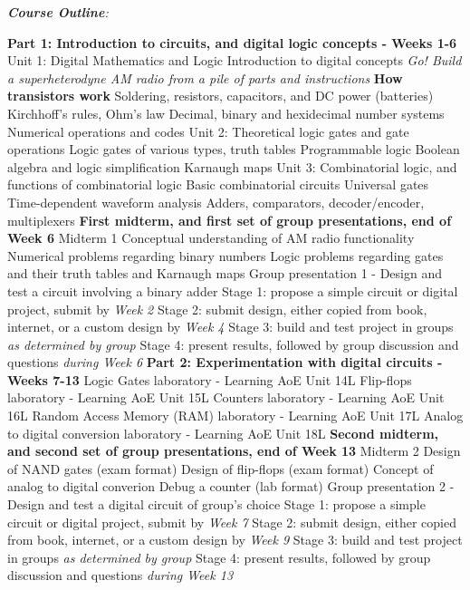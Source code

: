 \documentclass[10pt]{article}
\begin{document}
\clearpage
\textit{\textbf{Course Outline}:}
\begin{outline}[enumerate]
\1 \textbf{Part 1: Introduction to circuits, and digital logic concepts - Weeks 1-6}
\2 Unit 1: Digital Mathematics and Logic
\3 Introduction to digital concepts
\3 \textit{Go!  Build a superheterodyne AM radio from a pile of parts and instructions}
\4 \textbf{How transistors work}
\4 Soldering, resistors, capacitors, and DC power (batteries)
\4 Kirchhoff's rules, Ohm's law
\3 Decimal, binary and hexidecimal number systems
\3 Numerical operations and codes
\2 Unit 2: Theoretical logic gates and gate operations
\3 Logic gates of various types, truth tables
\3 Programmable logic
\3 Boolean algebra and logic simplification
\3 Karnaugh maps
\2 Unit 3: Combinatorial logic, and functions of combinatorial logic 
\3 Basic combinatorial circuits
\3 Universal gates
\3 Time-dependent waveform analysis
\3 Adders, comparators, decoder/encoder, multiplexers
\1 \textbf{First midterm, and first set of group presentations, end of Week 6}
\2 Midterm 1
\3 Conceptual understanding of AM radio functionality
\3 Numerical problems regarding binary numbers
\3 Logic problems regarding gates and their truth tables and Karnaugh maps
\2 Group presentation 1 - Design and test a circuit involving a binary adder
\3 Stage 1: propose a simple circuit or digital project, submit by \textit{Week 2}
\3 Stage 2: submit design, either copied from book, internet, or a custom design by \textit{Week 4}
\3 Stage 3: build and test project in groups \textit{as determined by group}
\3 Stage 4: present results, followed by group discussion and questions \textit{during Week 6}
\1 \textbf{Part 2: Experimentation with digital circuits - Weeks 7-13}
\2 Logic Gates laboratory - Learning AoE Unit 14L
\2 Flip-flops laboratory - Learning AoE Unit 15L
\2 Counters laboratory - Learning AoE Unit 16L
\2 Random Access Memory (RAM) laboratory - Learning AoE Unit 17L
\2 Analog to digital conversion laboratory - Learning AoE Unit 18L
\1 \textbf{Second midterm, and second set of group presentations, end of Week 13}
\2 Midterm 2
\3 Design of NAND gates (exam format)
\3 Design of flip-flops (exam format)
\3 Concept of analog to digital converion
\3 Debug a counter (lab format)
\2 Group presentation 2 - Design and test a digital circuit of group's choice
\3 Stage 1: propose a simple circuit or digital project, submit by \textit{Week 7}
\3 Stage 2: submit design, either copied from book, internet, or a custom design by \textit{Week 9}
\3 Stage 3: build and test project in groups \textit{as determined by group}
\3 Stage 4: present results, followed by group discussion and questions \textit{during Week 13}
\end{outline}
\end{document}

